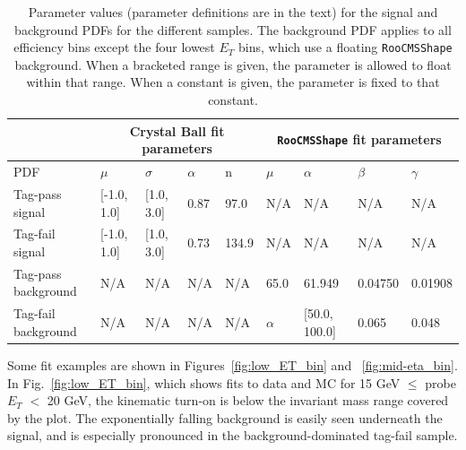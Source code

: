 \documentclass[dissertation.tex]{subfiles}
\begin{document}
\begin{table}[hcbp]
\caption{Parameter values (parameter definitions are in the text) for the signal and background PDFs for the different samples.  The background PDF applies to all efficiency bins except the four lowest $E_{T}$ bins, which use a floating \texttt{RooCMSShape} background.  When a bracketed range is given, the parameter is allowed to float within that range.  When a constant is given, the parameter is fixed to that constant.}
\centering
\begin{tabular}{|m{1.25cm}|m{1.25cm}|m{1.25cm}|m{1.25cm}|m{1.25cm}|m{1.25cm}|m{1.25cm}|m{1.25cm}|m{1.25cm}|}
\hline
& \multicolumn{4}{c|}{Crystal Ball fit parameters} & \multicolumn{4}{c|}{\texttt{RooCMSShape} fit parameters} \\
\hline
PDF & $\mu$ & $\sigma$ & $\alpha$ & n & $\mu$ & $\alpha$ & $\beta$ & $\gamma$ \\
\hline
Tag-pass signal & [-1.0, 1.0] & [1.0, 3.0] & 0.87 & 97.0 & N/A & N/A & N/A & N/A \\
\hline
Tag-fail signal & [-1.0, 1.0] & [1.0, 3.0] & 0.73 & 134.9 & N/A & N/A & N/A & N/A \\
\hline
Tag-pass background & N/A & N/A & N/A & N/A & 65.0 & 61.949 & 0.04750 & 0.01908 \\
\hline
Tag-fail background & N/A & N/A & N/A & N/A & $\alpha$ & [50.0, 100.0] & 0.065 & 0.048 \\
\hline
\end{tabular}
\label{tab:PDFs}
\end{table}

Some fit examples are shown in Figures~\ref{fig:low_ET_bin} and ~\ref{fig:mid-eta_bin}.  In Fig.~\ref{fig:low_ET_bin}, which shows fits to data and MC for 15 GeV $\leq$ probe $E_{T}$ $<$ 20 GeV, the kinematic turn-on is below the invariant mass range covered by the plot.  The exponentially falling background is easily seen underneath the signal, and is especially pronounced in the background-dominated tag-fail sample.
\end{document}
